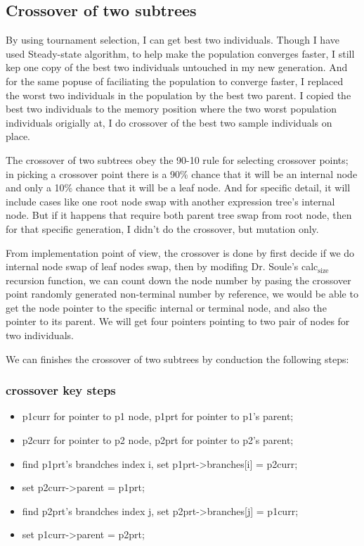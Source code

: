 \documentclass[10pt,b5paper]{article}
\begin{document}
\subsection{Crossover of two subtrees}
\label{sec-1-2}
By using tournament selection, I can get best two individuals. Though I have used Steady-state algorithm, to help make the population converges faster, I still kep one copy of the best two individuals untouched in my new generation. And for the same popuse of faciliating the population to converge faster, I replaced the worst two individuals in the population by the best two parent. I copied the best two individuals to the memory position where the two worst population individuals origially at, I do crossover of the best two sample individuals on place.

The crossover of two subtrees obey the 90-10 rule for selecting crossover points; in picking a crossover point there is a 90\% chance that it will be an internal node and only a 10\% chance that it will be a leaf node. And for specific detail, it will include cases like one root node swap with another expression tree's internal node. But if it happens that require both parent tree swap from root node, then for that specific generation, I didn't do the crossover, but mutation only. 

From implementation point of view, the crossover is done by first decide if we do internal node swap of leaf nodes swap, then by modifing Dr. Soule's calc$_{\text{size}}$ recursion function, we can count down the node number by pasing the crossover point randomly generated non-terminal number by reference, we would be able to get the node pointer to the specific internal or terminal node, and also the pointer to its parent. We will get four pointers pointing to two pair of nodes for two individuals. 

We can finishes the crossover of two subtrees by conduction the following steps: 
\subsubsection{crossover key steps}
\label{sec-1-2-1}
\begin{itemize}
\item p1curr for pointer to p1 node, p1prt for pointer to p1's parent;
\item p2curr for pointer to p2 node, p2prt for pointer to p2's parent;
\item find p1prt's brandches index i, set p1prt->branches[i] = p2curr;
\item set p2curr->parent = p1prt;
\item find p2prt's brandches index j, set p2prt->branches[j] = p1curr;
\item set p1curr->parent = p2prt;
\end{itemize}
\end{document}
